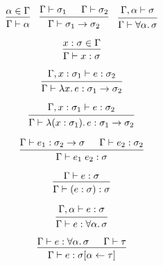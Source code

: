 \documentclass[12pt]{article}
\begin{document}
\pagestyle{empty}

\[
    \begin{prooftree}
        \hypo{\alpha \in \Gamma}
        \infer1{\Gamma \vdash \alpha}
    \end{prooftree}
    \hspace{1em}
    \begin{prooftree}
        \hypo{\Gamma \vdash \sigma_1}
        \hypo{\Gamma \vdash \sigma_2}
        \infer2{\Gamma \vdash \sigma_1 \to \sigma_2}
    \end{prooftree}
    \hspace{1em}
    \begin{prooftree}
        \hypo{\Gamma, \alpha \vdash \sigma}
        \infer1{\Gamma \vdash \forall \alpha\ldotp \sigma}
    \end{prooftree}
\]

\[
    \begin{prooftree}
        \hypo{x:\sigma \in \Gamma}
        \infer1{\Gamma \vdash x:\sigma}
    \end{prooftree}
\]

\[
    \begin{prooftree}
        \hypo{\Gamma, x: \sigma_1 \vdash e: \sigma_2}
        \infer1{\Gamma \vdash \lambda x\ldotp e: \sigma_1 \to \sigma_2}
    \end{prooftree}
\]

\[
    \begin{prooftree}
        \hypo{\Gamma, x: \sigma_1 \vdash e: \sigma_2}
        \infer1{\Gamma \vdash \lambda (x: \sigma_1)\ldotp e: \sigma_1 \to \sigma_2}
    \end{prooftree}
\]

\[
    \begin{prooftree}
        \hypo{\Gamma \vdash e_1: \sigma_2 \to \sigma}
        \hypo{\Gamma \vdash e_2: \sigma_2}
        \infer2{\Gamma \vdash e_1\; e_2: \sigma}
    \end{prooftree}
\]

\[
    \begin{prooftree}
        \hypo{\Gamma \vdash e: \sigma}
        \infer1{\Gamma \vdash (e: \sigma): \sigma}
    \end{prooftree}
\]

\[
    \begin{prooftree}
        \hypo{\Gamma, \alpha \vdash e: \sigma}
        \infer1{\Gamma \vdash e: \forall \alpha\ldotp \sigma}
    \end{prooftree}
\]

\[
    \begin{prooftree}
        \hypo{\Gamma \vdash e: \forall \alpha\ldotp \sigma}
        \hypo{\Gamma \vdash \tau}
        \infer2{\Gamma \vdash e: \sigma[\alpha \leftarrow \tau]}
    \end{prooftree}
\]
\end{document}

